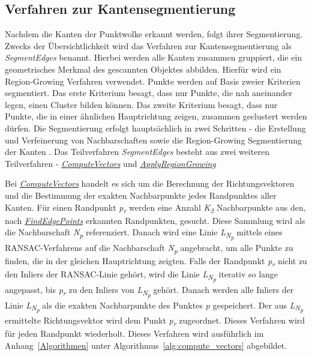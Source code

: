 \subsection{Verfahren zur Kantensegmentierung} \label{edge_segmentation}
Nachdem die Kanten der Punktwolke erkannt werden, folgt ihrer Segmentierung. Zwecks der Übersichtlichkeit wird das Verfahren zur Kantensegmentierung als \textit{SegmentEdges} benannt. Hierbei werden alle Kanten zusammen gruppiert, die ein geometrisches Merkmal des gescannten Objektes abbilden. Hierfür wird ein Region-Growing Verfahren verwendet. Punkte werden auf Basis zweier Kriterien segmentiert. Das erste Kriterium besagt, dass nur Punkte, die nah aneinander legen, einen Cluster bilden können. Das zweite Kriterium besagt, dass nur Punkte, die in einer ähnlichen Hauptrichtung zeigen, zusammen geclustert werden dürfen. Die Segmentierung erfolgt hauptsächlich in zwei Schritten - die Erstellung und Verfeinerung von Nachbarschaften sowie die Region-Growing Segmentierung der Kanten \autocite{ni_edge_2016}. Das Teilverfahren \textit{SegmentEdges} besteht aus zwei weiteren Teilverfahren - \textit{\hyperref[alg:compute_vectors]{ComputeVectors}} und \textit{\hyperref[alg:apply_region_growing]{ApplyRegionGrowing}}

Bei \textit{\hyperref[alg:compute_vectors]{ComputeVectors}} handelt es sich um die Berechnung der Richtungsvektoren und die Bestimmung der exakten Nachbarpunkte jedes Randpunktes aller Kanten. Für einen Randpunkt \textit{p\textsubscript{r}} werden eine Anzahl \textit{K\textsubscript{2}} Nachbarpunkte aus den, nach \textit{\hyperref[alg:find_edge_points]{FindEdgePoints}} erkannten Randpunkten, gesucht. Diese Sammlung wird als die Nachbarschaft \textit{N\textsubscript{p}} referenziert. Danach wird eine Linie \textit{L\textsubscript{N\textsubscript{p}}} mittels eines RANSAC-Verfahrens auf die Nachbarschaft \textit{N\textsubscript{p}} angebracht, um alle Punkte zu finden, die in der gleichen Hauptrichtung zeigten. Falls der Randpunkt \textit{p\textsubscript{r}} nicht zu den Inliers der RANSAC-Linie gehört, wird die Linie \textit{L\textsubscript{N\textsubscript{p}}} iterativ so lange angepasst, bis \textit{p\textsubscript{r}} zu den Inliers von \textit{L\textsubscript{N\textsubscript{p}}} gehört. Danach werden alle Inliers der Linie \textit{L\textsubscript{N\textsubscript{p}}} als die exakten Nachbarpunkte des Punktes \textit{p} gespeichert. Der aus \textit{L\textsubscript{N\textsubscript{p}}} ermittelte Richtungsvektor wird dem Punkt \textit{p\textsubscript{r}} zugeordnet. Dieses Verfahren wird für jeden Randpunkt wiederholt. Dieses Verfahren wird ausführlich im Anhang~\ref{Algorithmen} unter Algorithmus~\ref{alg:compute_vectors} abgebildet.

